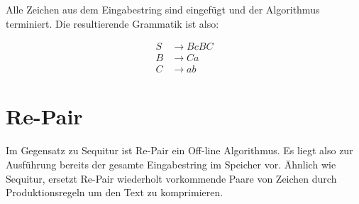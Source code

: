 Alle Zeichen aus dem Eingabestring sind eingefügt und der Algorithmus terminiert. Die resultierende Grammatik ist also:

\begin{align*}
	S &\rightarrow BcBC\\
	B &\rightarrow Ca\\
	C &\rightarrow ab
\end{align*}


\section{Re-Pair}

Im Gegensatz zu Sequitur ist Re-Pair\cite{larsson_off-line_2000} ein Off-line Algorithmus. Es liegt also zur Ausführung bereits der gesamte Eingabestring im Speicher vor. Ähnlich wie Sequitur, ersetzt Re-Pair wiederholt vorkommende Paare von Zeichen durch Produktionsregeln um den Text zu komprimieren. 